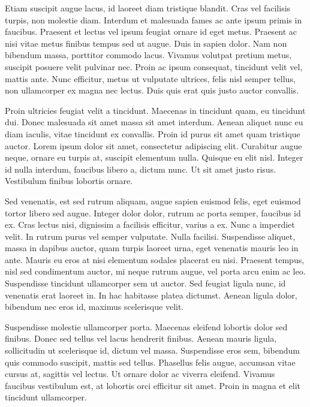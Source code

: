 \documentclass[12pt, letterpaper,twocolumn]{article}
\begin{document}
Etiam suscipit augue lacus, id laoreet diam tristique blandit. Cras vel facilisis turpis, non molestie diam. Interdum et malesuada fames ac ante ipsum primis in faucibus. Praesent et lectus vel ipsum feugiat ornare id eget metus. Praesent ac nisi vitae metus finibus tempus sed ut augue. Duis in sapien dolor. Nam non bibendum massa, porttitor commodo lacus. Vivamus volutpat pretium metus, suscipit posuere velit pulvinar nec. Proin ac ipsum consequat, tincidunt velit vel, mattis ante. Nunc efficitur, metus ut vulputate ultrices, felis nisl semper tellus, non ullamcorper ex magna nec lectus. Duis quis erat quis justo auctor convallis.

Proin ultricies feugiat velit a tincidunt. Maecenas in tincidunt quam, eu tincidunt dui. Donec malesuada sit amet massa sit amet interdum. Aenean aliquet nunc eu diam iaculis, vitae tincidunt ex convallis. Proin id purus sit amet quam tristique auctor. Lorem ipsum dolor sit amet, consectetur adipiscing elit. Curabitur augue neque, ornare eu turpis at, suscipit elementum nulla. Quisque eu elit nisl. Integer id nulla interdum, faucibus libero a, dictum nunc. Ut sit amet justo risus. Vestibulum finibus lobortis ornare.

Sed venenatis, est sed rutrum aliquam, augue sapien euismod felis, eget euismod tortor libero sed augue. Integer dolor dolor, rutrum ac porta semper, faucibus id ex. Cras lectus nisi, dignissim a facilisis efficitur, varius a ex. Nunc a imperdiet velit. In rutrum purus vel semper vulputate. Nulla facilisi. Suspendisse aliquet, massa in dapibus auctor, quam turpis laoreet urna, eget venenatis mauris leo in ante. Mauris eu eros at nisi elementum sodales placerat eu nisi. Praesent tempus, nisl sed condimentum auctor, mi neque rutrum augue, vel porta arcu enim ac leo. Suspendisse tincidunt ullamcorper sem ut auctor. Sed feugiat ligula nunc, id venenatis erat laoreet in. In hac habitasse platea dictumst. Aenean ligula dolor, bibendum nec eros id, maximus scelerisque velit.

Suspendisse molestie ullamcorper porta. Maecenas eleifend lobortis dolor sed finibus. Donec sed tellus vel lacus hendrerit finibus. Aenean mauris ligula, sollicitudin ut scelerisque id, dictum vel massa. Suspendisse eros sem, bibendum quis commodo suscipit, mattis sed tellus. Phasellus felis augue, accumsan vitae cursus at, sagittis vel lectus. Ut ornare dolor ac viverra eleifend. Vivamus faucibus vestibulum est, at lobortis orci efficitur sit amet. Proin in magna et elit tincidunt ullamcorper.
\end{document}
